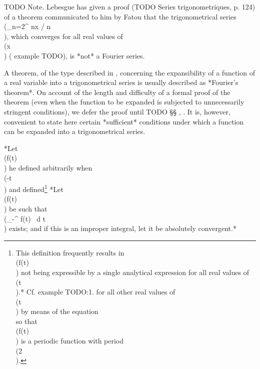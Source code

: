 TODO Note. Lebesgue has given a proof (TODO Series trigonometriques, p. 124) of a
theorem communicated to him by Fatou that the trigonometrical series
\\(\sum_{n=2}^{\infty} \sin nx / \log n\\), which converges for all real values of \\(x\\)
( example TODO), is *not* a Fourier series.

A theorem, of the type described in , concerning the
expansibility of a function of a real variable into a trigonometrical
series is usually described
%
%
as *Fourier's theorem*. On account of the length and difficulty of a
formal proof of the theorem (even when the function to be expanded is
subjected to unnecessarily stringent conditions), we defer the proof
until TODO §§ , .
It is, however, convenient to state here certain
*sufficient* conditions under which a function can be expanded into a
trigonometrical series.

*Let \\(f(t)\\) he defined arbitrarily when \\(-\pi \leq t \leq \pi\\)
  and defined\footnote{This definition frequently results in \\(f(t)\\) not being
    expressible by a single analytical expression for all real values of \\(t\\).*
    Cf. example TODO:1.
  for all other real values of \\(t\\) by means of the equation
  \\[ 
  f(t + 2\pi) = f(t),
  \\] 
  so that \\(f(t)\\) is a periodic function with period \\(2\pi\\).
}
*Let \\(f(t)\\) be such that
  \\(\int_{-\pi}^{\pi} f(t) \, d t\\) exists; and if this is an improper
  integral, let it be absolutely convergent.*

